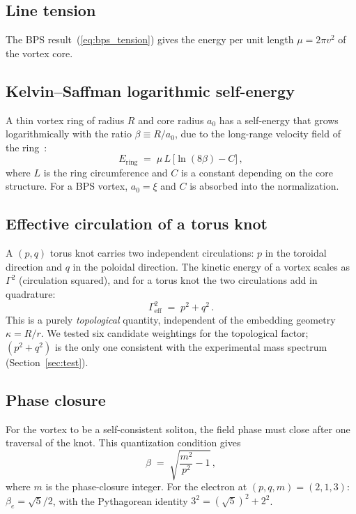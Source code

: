\documentclass[11pt]{article}
\begin{document}
\subsection{Line tension}

The BPS result~(\ref{eq:bps_tension}) gives the energy per unit length
$\mu = 2\pi v^2$ of the vortex core.

\subsection{Kelvin--Saffman logarithmic self-energy}

A thin vortex ring of radius $R$ and core radius $a_0$ has a
self-energy that grows logarithmically with the ratio
$\beta \equiv R/a_0$, due to the long-range velocity field of the
ring~\cite{Kelvin1867,Saffman1992}:
\begin{equation}
\label{eq:kelvin}
E_\text{ring} \;=\; \mu\,L\,\bigl[\ln(8\beta) - C\bigr]\,,
\end{equation}
where $L$ is the ring circumference and $C$ is a constant depending
on the core structure.  For a BPS vortex, $a_0 = \xi$ and
$C$ is absorbed into the normalization.

\subsection{Effective circulation of a torus knot}

A $(p,q)$ torus knot carries two independent circulations: $p$ in the
toroidal direction and $q$ in the poloidal direction.  The kinetic
energy of a vortex scales as $\Gamma^2$ (circulation squared), and
for a torus knot the two circulations add in quadrature:
\begin{equation}
\label{eq:circulation}
\Gamma_\text{eff}^2 \;=\; p^2 + q^2\,.
\end{equation}
This is a purely \emph{topological} quantity, independent of the
embedding geometry~$\kappa = R/r$.  We tested six candidate weightings
for the topological factor; $(p^2+q^2)$ is the only one consistent
with the experimental mass spectrum (Section~\ref{sec:test}).

\subsection{Phase closure}

For the vortex to be a self-consistent soliton, the field phase must
close after one traversal of the knot.  This quantization condition
gives
\begin{equation}
\label{eq:phase_closure}
\beta \;=\; \sqrt{\frac{m^2}{p^2} - 1}\,,
\end{equation}
where $m$ is the phase-closure integer.  For the electron at
$(p,q,m) = (2,1,3)$: $\beta_e = \sqrt{5}/2$, with the Pythagorean
identity $3^2 = (\sqrt{5})^2 + 2^2$.
\end{document}
